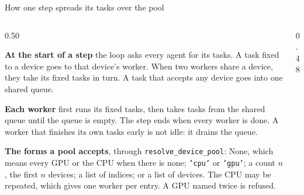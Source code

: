 \documentclass[aspectratio=169,10pt]{beamer}
\newcommand{\tagchip}[2]{{\setlength{\fboxsep}{2.5pt}\setlength{\fboxrule}{0.6pt}%
  \fcolorbox{white}{#1}{\textcolor{white}{\footnotesize\bfseries\strut #2}}}}
\newcommand{\macechip}{\tagchip{planAccent}{MACE}}
\newcommand{\head}[1]{\textbf{#1}}
\begin{document}
\begin{frame}{How one step spreads its tasks over the pool \hfill \macechip}
  \begin{columns}[T]
    \begin{column}{0.50\textwidth}
      {\footnotesize
      \head{At the start of a step} the loop asks every agent for its
      tasks.  A task fixed to a device goes to that device's worker.  When
      two workers share a device, they take its fixed tasks in turn.  A
      task that accepts any device goes into one shared
      queue.\par\vspace{5pt}
      \head{Each worker} first runs its fixed tasks, then takes tasks from
      the shared queue until the queue is empty.  The step ends when every
      worker is done.  A worker that finishes its own tasks early is not
      idle: it drains the queue.\par\vspace{5pt}
      \head{The forms a pool accepts}, through \texttt{resolve\_device\_pool}:
      None, which means every GPU or the CPU when there is none;
      \texttt{'cpu'} or \texttt{'gpu'}; a count $n$, the first $n$ devices;
      a list of indices; or a list of devices.  The CPU may be repeated,
      which gives one worker per entry.  A GPU named twice is
      refused.\par}
    \end{column}
    \begin{column}{0.48\textwidth}
      \centering
\end{column}
\end{columns}
\end{frame}
\end{document}
